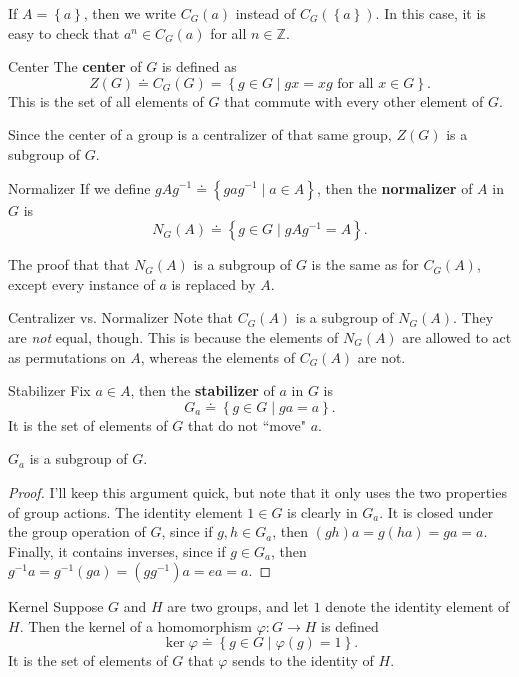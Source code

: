 \documentclass[10pt]{report}
\begin{document}
If $A = \left\{ a \right\}$, then we write $C_G(a)$ instead of $C_G(\left\{ a \right\})$. In this case, it is easy to check that $a^n \in C_G(a)$ for all $n \in \mathbb{Z}$.

\begin{defn}{Center}{}
The \textbf{center} of $G$ is defined as
\[
	Z(G) \doteq C_G(G) = \left\{ g\in G\;|\; gx=xg \text{ for all } x \in G \right\}.
\] This is the set of all elements of $G$ that commute with every other element of $G$.
\end{defn}

Since the center of a group is a centralizer of that same group, $Z(G)$ is a subgroup of $G$.

\begin{defn}{Normalizer}{}
If we define $gAg^{-1} \doteq \left\{ gag^{-1} \;|\; a\in A \right\}$, then the \textbf{normalizer} of $A$ in $G$ is
\[
	N_G(A) \doteq \left\{ g \in G \;|\; gAg^{-1} = A\right\}.
\]
\end{defn}

The proof that that $N_G(A)$ is a subgroup of $G$ is the same as for $C_G(A)$, except every instance of $a$ is replaced by $A$.

\begin{note}{Centralizer vs. Normalizer}{}
	Note that $C_G(A)$ is a subgroup of $N_G(A)$. They are \textit{not} equal, though. This is because the elements of $N_G(A)$ are allowed to act as permutations on $A$, whereas the elements of $C_G(A)$ are not.
\end{note}

\begin{defn}{Stabilizer}{}
Fix $a \in A$, then the \textbf{stabilizer} of $a$ in $G$ is
\[
G_a \doteq \left\{ g\in G \;|\; ga=a \right\}.
\] It is the set of elements of $G$ that do not ``move" $a$.
\end{defn}

\begin{prop}
$G_a$ is a subgroup of $G$.
\end{prop}
\begin{proof}
	I'll keep this argument quick, but note that it only uses the two properties of group actions. The identity element $1 \in G$ is clearly in $G_a$. It is closed under the group operation of $G$, since if $g,h \in G_a$, then $(gh)a = g(ha) = ga = a$. Finally, it contains inverses, since if $g \in G_a$, then $g^{-1}a = g^{-1}(ga) = (gg^{-1})a = ea = a$.
\end{proof}

\begin{defn}{Kernel}{}
Suppose $G$ and $H$ are two groups, and let $1$ denote the identity element of $H$. Then the kernel of a homomorphism $\varphi:G\to H$ is defined
\[
	\ker \varphi \doteq \left\{ g \in G \;|\; \varphi(g) = 1 \right\}.
\] It is the set of elements of $G$ that $\varphi$ sends to the identity of $H$.
\end{defn}
\end{document}
